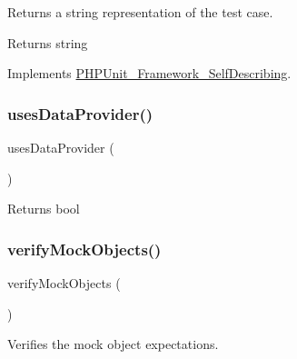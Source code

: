 Returns a string representation of the test case.

\begin{DoxyReturn}{Returns}
string 
\end{DoxyReturn}


Implements \mbox{\hyperlink{interface_p_h_p_unit___framework___self_describing_a5558c5d549f41597377fa1ea8a1cefa3}{P\+H\+P\+Unit\+\_\+\+Framework\+\_\+\+Self\+Describing}}.

\mbox{\label{class_p_h_p_unit___framework___test_case_aaceec449a3d3d496a69aa56450adbfeb}} 
\subsubsection{\texorpdfstring{uses\+Data\+Provider()}{usesDataProvider()}}
{\footnotesize\ttfamily uses\+Data\+Provider (\begin{DoxyParamCaption}{ }\end{DoxyParamCaption})}

\begin{DoxyReturn}{Returns}
bool 
\end{DoxyReturn}
\mbox{\label{class_p_h_p_unit___framework___test_case_a11e8b1ce7043340e31f0fd2c59ee35c6}} 
\subsubsection{\texorpdfstring{verify\+Mock\+Objects()}{verifyMockObjects()}}
{\footnotesize\ttfamily verify\+Mock\+Objects (\begin{DoxyParamCaption}{ }\end{DoxyParamCaption})\hspace{0.3cm}{\ttfamily [protected]}}

Verifies the mock object expectations. 

